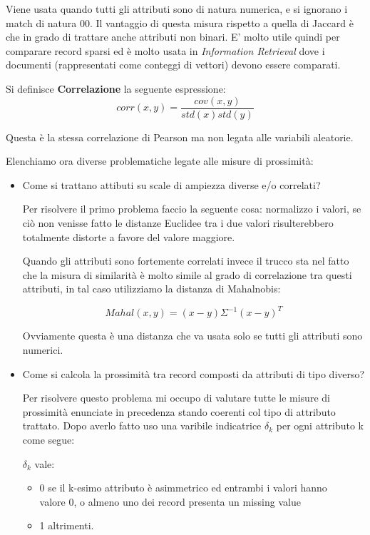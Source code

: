  Viene usata quando tutti gli attributi sono di natura numerica, e si ignorano i match di natura 00. Il vantaggio di questa misura rispetto a quella di Jaccard è che in grado di trattare anche attributi non binari. E' molto utile quindi per comparare record sparsi ed è molto usata in \textit{Information Retrieval} dove i documenti (rappresentati come conteggi di vettori) devono essere comparati.


\begin{defn}
	Si definisce \textbf{Correlazione} la seguente espressione:    \[ corr(x,y) = \frac{cov(x,y)}{std(x)std(y)}\]
\end{defn}
Questa è la stessa correlazione di Pearson ma non legata alle variabili aleatorie.

Elenchiamo ora diverse problematiche legate alle misure di prossimità:
\begin{itemize}
	\item Come si trattano attibuti su scale di ampiezza diverse e/o correlati?
	
	Per risolvere il primo problema faccio la seguente cosa: normalizzo i valori, se ciò non venisse fatto le distanze Euclidee tra i due valori risulterebbero totalmente distorte a favore del valore maggiore. 
	
	Quando gli attributi sono fortemente correlati invece il trucco sta nel fatto che la misura di similarità è molto simile al grado di correlazione tra questi attributi, in tal caso utilizziamo la distanza di Mahalnobis:
	
	\[Mahal(x,y) = (x- y)\Sigma^{-1}(x- y)^{T}\]
	
	Ovviamente questa è una distanza che va usata solo se tutti gli attributi sono numerici.
	\item Come si calcola la prossimità tra record composti da attributi di tipo diverso?
	
	 Per risolvere questo problema mi occupo di valutare tutte le misure di prossimità enunciate in precedenza stando coerenti col tipo di attributo trattato.  
	Dopo averlo fatto uso una varibile indicatrice $\delta_{k}$ per ogni attributo k come segue:
	
	$\delta_{k}$ vale:
	\begin{itemize}
		\item 0  se il k-esimo attributo è asimmetrico ed entrambi i valori hanno \\  valore 0,  o almeno uno dei record presenta un missing value
		\item 1 altrimenti.
	\end{itemize} 



\end{itemize}

